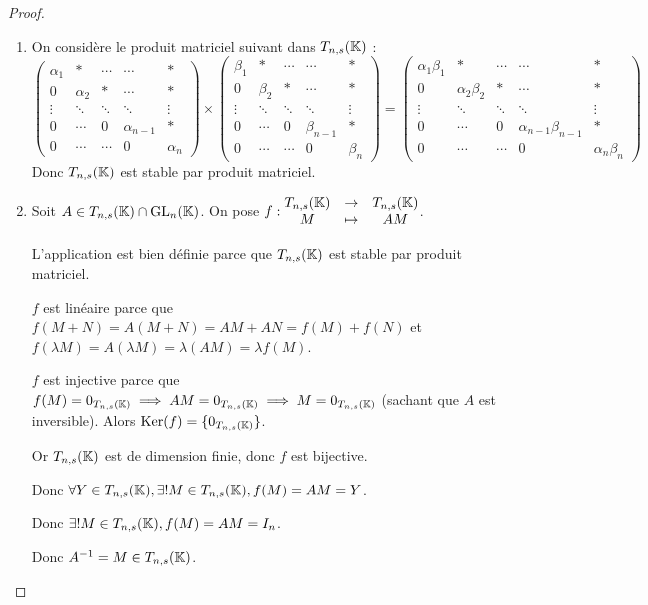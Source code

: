 \documentclass[12pt, a4paper]{report}
\begin{document}
\begin{proof}
    \begin{enumerate}
        \item On considère le produit matriciel suivant dans $T_{n,s}(\mathbb{K})$ :
        $$\left(\begin{matrix}\alpha_1 & * & \cdots & \cdots & * \\ 0 & \alpha_2 & * & \cdots & * \\ \vdots & \ddots & \ddots & \ddots & \vdots \\ 0 & \cdots & 0 & \alpha_{n-1} & * \\ 0 & \cdots & \cdots & 0 & \alpha_n\end{matrix}\right) \times \left(\begin{matrix}\beta_1 & * & \cdots & \cdots & * \\ 0 & \beta_2 & * & \cdots & * \\ \vdots & \ddots & \ddots & \ddots & \vdots \\ 0 & \cdots & 0 & \beta_{n-1} & * \\ 0 & \cdots & \cdots & 0 & \beta_n\end{matrix}\right) = \left(\begin{matrix}\alpha_1 \beta_1 & * & \cdots & \cdots & * \\ 0 & \alpha_2 \beta_2 & * & \cdots & * \\ \vdots & \ddots & \ddots & \ddots & \vdots \\ 0 & \cdots & 0 & \alpha_{n-1} \beta_{n-1} & * \\ 0 & \cdots & \cdots & 0 & \alpha_n \beta_n\end{matrix}\right)$$
        Donc $T_{n,s}(\mathbb{K})$ est stable par produit matriciel.
        \item Soit $A \in T_{n,s}(\mathbb{K})\cap \mathrm{GL}_n(\mathbb{K})$.
        On pose $f : \begin{matrix} T_{n,s}(\mathbb{K}) &\to &T_{n,s}(\mathbb{K}) \\ M &\mapsto &AM \end{matrix}$.
        
        L'application est bien définie parce que $T_{n,s}(\mathbb{K})$ est stable par produit matriciel.
        
        $f$ est linéaire parce que $f(M+N) = A(M+N) = AM + AN = f(M) + f(N)$ et $f(\lambda M) = A(\lambda M) = \lambda (AM) = \lambda f(M)$.
        
        $f$ est injective parce que $f(M) = 0_{T_{n,s}(\mathbb{K})} \implies AM = 0_{T_{n,s}(\mathbb{K})} \implies M = 0_{T_{n,s}(\mathbb{K})}$ (sachant que $A$ est inversible). Alors $\mathrm{Ker}(f) = \{0_{T_{n,s}(\mathbb{K})}\}$.
        
        Or $T_{n,s}(\mathbb{K})$ est de dimension finie, donc $f$ est bijective.

        Donc $\forall Y \in T_{n,s}(\mathbb{K}), \exists ! M \in T_{n,s}(\mathbb{K}), f(M) = AM = Y$.
        
        Donc $\exists ! M \in T_{n,s}(\mathbb{K}), f(M) = AM = I_n$.
        
        Donc $A^{-1} = M \in T_{n,s}(\mathbb{K})$.
    \end{enumerate}
\end{proof}
\end{document}
